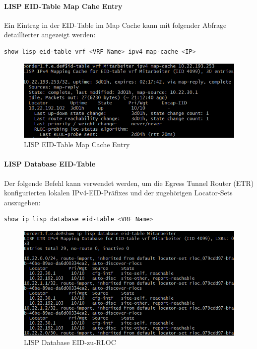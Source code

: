 \paragraph{LISP EID-Table Map Cahe Entry}
Ein Eintrag in der EID-Table im Map Cache kann mit folgender Abfrage detaillierter angezeigt werden:

\begin{lstlisting}[language=bash]
show lisp eid-table vrf <VRF Name> ipv4 map-cache <IP>
\end{lstlisting}


\begin{figure}[H]
	\centering
	\includegraphics[width=0.8\linewidth]{img/Absicherung/lisp_eid-table-entry}
	\caption{LISP EID-Table Map Cache Entry}
	\label{fig:LISP EID-Table Map Cache Entry}
\end{figure}

\paragraph{LISP Database EID-Table}
Der folgende Befehl kann verwendet werden, um die Egress Tunnel Router (ETR) konfigurierten lokalen IPv4-EID-Präfixes und der zugehörigen Locator-Sets auszugeben:

\begin{lstlisting}[language=bash]
show ip lisp database eid-table <VRF Name>
\end{lstlisting}

\begin{figure}[H]
	\centering
	\includegraphics[width=0.8\linewidth]{img/Absicherung/lisp_eid-table-database-rloc}
	\caption{LISP Database EID-zu-RLOC}
	\label{fig:LISP Database EID-zu-RLOC}
\end{figure}







